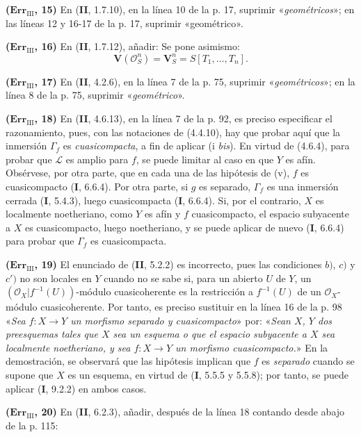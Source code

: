 \documentclass[10pt,oneside]{book}
\newcommand{\oldpage}[2][]{\setcounter{footnote}{0}\marginpar{\scriptsize\textbf{#1}~|~#2}\ignorespaces}
\begin{document}
\noindent\textbf{($\mathbf{Err}_{\mathrm{III}}$, 15)} En (\textbf{II}, 1.7.10), en
la línea 10 de la p. 17, suprimir «\emph{geométricos}»; en las líneas 12 y
16-17 de la p. 17, suprimir «geométrico».

\noindent\textbf{($\mathbf{Err}_{\mathrm{III}}$, 16)} En (\textbf{II}, 1.7.12),
añadir: Se pone asimismo:
\[
  \mathbf V(\mathscr O_S^n)=\mathbf V_S^n=S[T_1,\ldots,T_n].
\]

\noindent\textbf{($\mathbf{Err}_{\mathrm{III}}$, 17)} En (\textbf{II}, 4.2.6), en la
línea 7 de la p. 75, suprimir «\emph{geométricos}»; en la línea 8 de la p. 75,
suprimir «\emph{geométrico}».

\noindent\textbf{($\mathbf{Err}_{\mathrm{III}}$, 18)} En (\textbf{II}, 4.6.13), en la
línea 7 de la p. 92, es preciso especificar el razonamiento, pues, con las
notaciones de (4.4.10), hay que probar aquí que la inmersión $\Gamma_f$ es
\emph{cuasicompacta}, a fin de aplicar (i \emph{bis}). En virtud de (4.6.4), para
probar que $\mathscr L$ es amplio para $f$, se puede limitar al caso
en que $Y$ es afín. Obsérvese, por otra parte, que en cada una de las hipótesis
de (v), $f$ es cuasicompacto (\textbf I, 6.6.4). Por otra parte, si $g$ es
\oldpage[III]{221}
separado, $\Gamma_f$ es una inmersión cerrada (\textbf I, 5.4.3), luego cuasicompacta
(\textbf I, 6.6.4). Si, por el contrario, $X$ es localmente noetheriano, como $Y$ es
afín y $f$ cuasicompacto, el espacio subyacente a $X$ es cuasicompacto, luego
noetheriano, y se puede aplicar de nuevo (\textbf I, 6.6.4) para probar que $\Gamma_f$
es cuasicompacta.

\noindent\textbf{($\mathbf{Err}_{\mathrm{III}}$, 19)} El enunciado de (\textbf{II},
5.2.2) es incorrecto, pues las condiciones $b)$, $c)$ y $c')$ no son locales
en $Y$ cuando no se sabe si, para un abierto $U$ de $Y$, un
$(\mathscr O_X|f^{-1}(U))$-módulo cuasicoherente es la restricción a
$f^{-1}(U)$ de un $\mathscr O_X$-módulo cuasicoherente. Por tanto, es preciso
sustituir en la línea 16 de la p. 98 «\emph{Sea $f:X\to Y$ un morfismo separado
y cuasicompacto}» por: «\emph{Sean $X$, $Y$ dos preesquemas tales que $X$ sea
un esquema o que el espacio subyacente a $X$ sea localmente noetheriano, y sea
$f:X\to Y$ un morfismo cuasicompacto.}» En la demostración, se observará que
las hipótesis implican que $f$ es \emph{separado} cuando se supone que $X$ es
un esquema, en virtud de (\textbf I, 5.5.5 y 5.5.8); por tanto, se puede aplicar
(\textbf I, 9.2.2) en ambos casos.

\noindent\textbf{($\mathbf{Err}_{\mathrm{III}}$, 20)} En (\textbf{II}, 6.2.3),
añadir, después de la línea 18 contando desde abajo de la p. 115:
\end{document}
